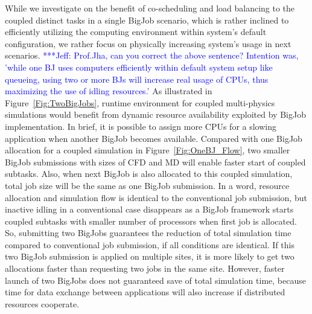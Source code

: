 \documentclass[conference,final]{IEEEtran}
\newcommand{\skonote}[1]{ {\textcolor{blue} { ***Jeff: #1 }}}
\newcommand{\skonote}[1]{}
\begin{document}
While we investigate on the benefit of co-scheduling and load balancing to the coupled distinct tasks in a single BigJob scenario, which is rather inclined to efficiently utilizing the computing environment within system's default configuration, we rather focus on physically increasing system's usage in next scenarios. 
\skonote{Prof.Jha, can you correct the above sentence? Intention was, 'while one BJ uses computers efficiently within default system setup like queueing, using two or more BJs will increase real usage of CPUs, thus maximizing the use of idling resources.'}
As illustrated in Figure~\ref{Fig:TwoBigJobs}, runtime environment for
coupled multi-physics simulations would benefit from dynamic resource
availability exploited by BigJob implementation. In brief, it is
possible to assign more CPUs for a slowing application when another
BigJob becomes available. Compared with one BigJob allocation for a
coupled simulation in Figure~\ref{Fig:OneBJ_Flow}, two smaller BigJob
submissions with sizes of CFD and MD will enable faster start of
coupled subtasks. Also, when next BigJob is also allocated to this
coupled simulation, total job size will be the same as one BigJob
submission. In a word, resource allocation and simulation flow is
identical to the conventional job submission, but inactive idling in a
conventional case disappears as a BigJob framework starts coupled
subtasks with smaller number of processors when first job is
allocated. So, submitting two BigJobs guarantees the reduction of
total simulation time compared to conventional job submission, if all
conditions are identical. If this two BigJob submission is applied on
multiple sites, it is more likely to get two allocations faster than
requesting two jobs in the same site. However, faster launch of two
BigJobs does not guaranteed save of total simulation time, because
time for data exchange between applications will also increase if
distributed resources cooperate.
\end{document}
